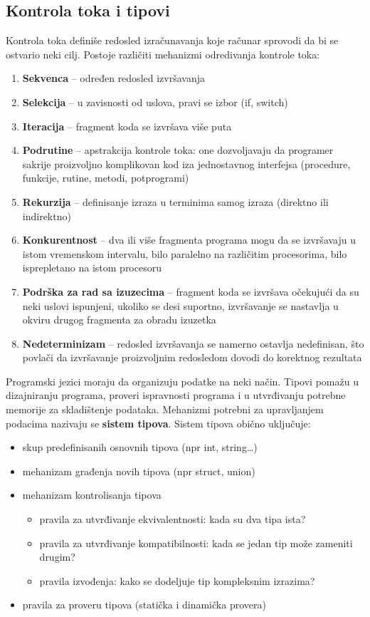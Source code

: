 \documentclass[../main.tex]{subfiles}
\begin{document}
\subsection{Kontrola toka i tipovi}
Kontrola toka definiše redosled izračunavanja koje računar sprovodi da bi se ostvario neki cilj. Postoje različiti mehanizmi odredivanja kontrole toka: 
\begin{enumerate}
\item {\bf Sekvenca} -- određen redosled izvršavanja
\item {\bf Selekcija} -- u zavisnosti od uslova, pravi se izbor (if, switch)
\item {\bf Iteracija} -- fragment koda se izvršava više puta
\item {\bf Podrutine} -- apstrakcija kontrole toka: one dozvoljavaju da programer sakrije proizvoljno komplikovan kod iza jednostavnog interfejsa (procedure, funkcije, rutine, metodi, potprogrami)
\item {\bf Rekurzija} -- definisanje izraza u terminima samog izraza (direktno
ili indirektno)
\item {\bf Konkurentnost} -- dva ili više fragmenta programa mogu da se izvršavaju u istom vremenskom intervalu, bilo paralelno na različitim procesorima, bilo isprepletano na istom procesoru
\item {\bf Podrška za rad sa izuzecima} -- fragment koda se izvršava očekujući da su neki uslovi ispunjeni, ukoliko se desi suportno, izvršavanje se nastavlja u okviru drugog fragmenta za obradu izuzetka
\item {\bf Nedeterminizam} -- redosled izvršavanja se namerno ostavlja nedefinisan, što povlači da izvršavanje proizvoljnim redosledom dovodi do korektnog rezultata
\end{enumerate}

\indent Programski jezici moraju da organizuju podatke na neki način. Tipovi pomažu u dizajniranju programa, proveri ispravnosti programa i u utvrđivanju potrebne memorije za skladištenje podataka. Mehanizmi potrebni za upravljanjem podacima nazivaju se {\bf sistem tipova}. Sistem tipova obično uključuje:
\begin{itemize}
\item skup predefinisanih osnovnih tipova (npr int, string\ldots)
\item mehanizam građenja novih tipova (npr struct, union)
\item mehanizam kontrolisanja tipova
	\begin{itemize}
	\item pravila za utvrđivanje ekvivalentnosti: kada su dva tipa ista?
	\item pravila za utvrđivanje kompatibilnosti: kada se jedan tip može zameniti drugim?
	\item pravila izvođenja: kako se dodeljuje tip kompleksnim izrazima?
	\end{itemize}
\item pravila za proveru tipova (statička i dinamička provera)
\end{itemize}
\end{document}
